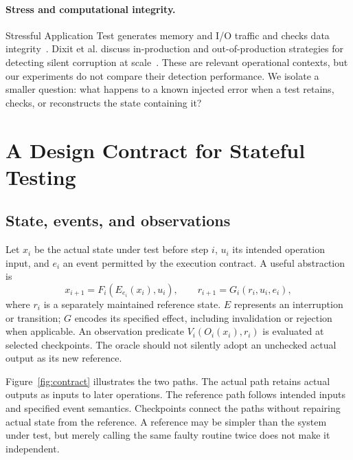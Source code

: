 \documentclass[10pt,twocolumn,letterpaper]{article}
\begin{document}
\paragraph{Stress and computational integrity.}
Stressful Application Test generates memory and I/O traffic and checks data integrity~\cite{stressapptest}. Dixit et al. discuss in-production and out-of-production strategies for detecting silent corruption at scale~\cite{dixit2022}. These are relevant operational contexts, but our experiments do not compare their detection performance. We isolate a smaller question: what happens to a known injected error when a test retains, checks, or reconstructs the state containing it?

\section{A Design Contract for Stateful Testing}
\subsection{State, events, and observations}
Let $x_i$ be the actual state under test before step $i$, $u_i$ its intended operation input, and $e_i$ an event permitted by the execution contract. A useful abstraction is
\begin{equation}
 x_{i+1}=F_i(E_{e_i}(x_i),u_i),\qquad
 r_{i+1}=G_i(r_i,u_i,e_i),
\end{equation}
where $r_i$ is a separately maintained reference state. $E$ represents an interruption or transition; $G$ encodes its specified effect, including invalidation or rejection when applicable. An observation predicate $V_i(O_i(x_i),r_i)$ is evaluated at selected checkpoints. The oracle should not silently adopt an unchecked actual output as its new reference.

Figure~\ref{fig:contract} illustrates the two paths. The actual path retains actual outputs as inputs to later operations. The reference path follows intended inputs and specified event semantics. Checkpoints connect the paths without repairing actual state from the reference. A reference may be simpler than the system under test, but merely calling the same faulty routine twice does not make it independent.
\end{document}

